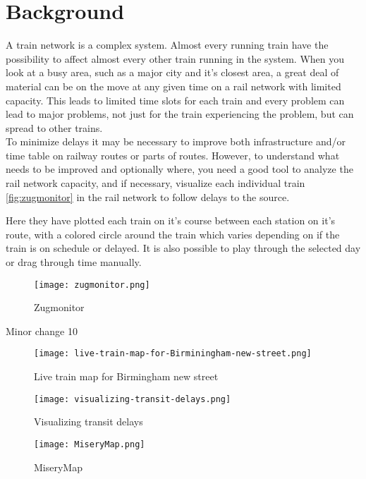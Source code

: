 
\chapter{Background}



A train network is a complex system. Almost every running train have the 
possibility to affect almost every other train running in the system.  When you look at a busy area, such as a major city and it's closest
area, a great deal of material can be on the move at any given time on a
rail network with limited capacity. This leads to limited time slots for each train and every
problem can lead to major problems, not just for the train experiencing the
problem, but can spread to other trains. \\

To minimize delays it may be necessary to improve both infrastructure and/or
time table on railway routes or parts of routes. However, to understand what
needs to be improved and optionally where, you need a good tool to analyze the
rail network capacity, and if necessary, visualize each individual train \vref{fig:zugmonitor} in the rail network to follow delays to the source.

Here they have plotted each train on it's course between each station on it's
route, with a colored circle around the train which varies depending on if the
train is on schedule or delayed. It is also possible to play through the
selected day or drag through time manually.

\begin{figure}[!htbp]
	\texttt{[image: zugmonitor.png]}
	\caption[Zugmonitor]{Zugmonitor \cite{zugmonitor}}
	\label{fig:zugmonitor}
\end{figure}

Minor change 10

\begin{figure}[!htbp]
	\texttt{[image: live-train-map-for-Birminingham-new-street.png]}
	\caption[Live train map for Birmingham new street]{Live train map for Birmingham new street \cite{birminghamLiveMap}}
	\label{fig:birminghamLiveMap}
\end{figure}

\begin{figure}[!htbp]
	\texttt{[image: visualizing-transit-delays.png]}
	\caption[Visualizing transit delays]{Visualizing transit delays \cite{muniLightRail}}
	\label{fig:muniLightRail}
\end{figure}

\begin{figure}[!htbp]
	\texttt{[image: MiseryMap.png]}
	\caption[MiseryMap]{MiseryMap \cite{flightAware:MiseryMap}}
	\label{fig:miserymap}
\end{figure}
 

